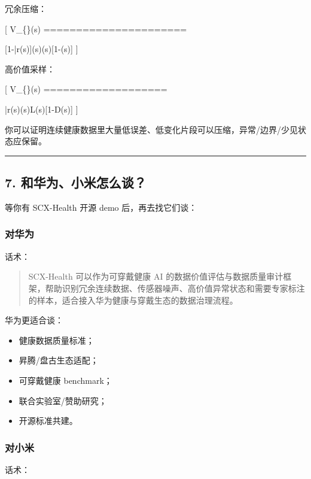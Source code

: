 \documentclass[
  12pt,
]{ctexart}
\providecommand{\tightlist}{%
  \setlength{\itemsep}{0pt}\setlength{\parskip}{0pt}}
\begin{document}
冗余压缩：

{[} V\_\{\}(s) ======================

{[}1-\bar r(s){]}\rho(s)(s){[}1-(s){]} {]}

高价值采样：

{[} V\_\{\}(s) ===================

\bar r(s)\rho(s)L(s){[}1-D(s){]} {]}

你可以证明连续健康数据里大量低误差、低变化片段可以压缩，异常/边界/少见状态应保留。

\begin{center}\rule{0.5\linewidth}{0.5pt}\end{center}

\subsection{7.
和华为、小米怎么谈？}\label{ux548cux534eux4e3aux5c0fux7c73ux600eux4e48ux8c08}

等你有 SCX-Health 开源 demo 后，再去找它们谈：

\subsubsection{对华为}\label{ux5bf9ux534eux4e3a}

话术：

\begin{quote}
SCX-Health 可以作为可穿戴健康 AI
的数据价值评估与数据质量审计框架，帮助识别冗余连续数据、传感器噪声、高价值异常状态和需要专家标注的样本，适合接入华为健康与穿戴生态的数据治理流程。
\end{quote}

华为更适合谈：

\begin{itemize}
\tightlist
\item
  健康数据质量标准；
\item
  昇腾/盘古生态适配；
\item
  可穿戴健康 benchmark；
\item
  联合实验室/赞助研究；
\item
  开源标准共建。
\end{itemize}

\subsubsection{对小米}\label{ux5bf9ux5c0fux7c73}

话术：
\end{document}
